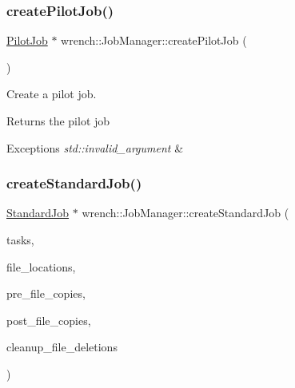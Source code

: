 \subsubsection{\texorpdfstring{create\+Pilot\+Job()}{createPilotJob()}}
{\footnotesize\ttfamily \hyperlink{classwrench_1_1_pilot_job}{Pilot\+Job} $\ast$ wrench\+::\+Job\+Manager\+::create\+Pilot\+Job (\begin{DoxyParamCaption}{ }\end{DoxyParamCaption})}



Create a pilot job. 

\begin{DoxyReturn}{Returns}
the pilot job
\end{DoxyReturn}

\begin{DoxyExceptions}{Exceptions}
{\em std\+::invalid\+\_\+argument} & \\
\hline
\end{DoxyExceptions}
\mbox{\label{classwrench_1_1_job_manager_a7f3873e56c8813c90b66683690d6b328}} 
\subsubsection{\texorpdfstring{create\+Standard\+Job()}{createStandardJob()}\hspace{0.1cm}{\footnotesize\ttfamily [1/3]}}
{\footnotesize\ttfamily \hyperlink{classwrench_1_1_standard_job}{Standard\+Job} $\ast$ wrench\+::\+Job\+Manager\+::create\+Standard\+Job (\begin{DoxyParamCaption}\item[{std\+::vector$<$ \hyperlink{classwrench_1_1_workflow_task}{Workflow\+Task} $\ast$$>$}]{tasks,  }\item[{std\+::map$<$ \hyperlink{classwrench_1_1_workflow_file}{Workflow\+File} $\ast$, \hyperlink{classwrench_1_1_storage_service}{Storage\+Service} $\ast$$>$}]{file\+\_\+locations,  }\item[{std\+::set$<$ std\+::tuple$<$ \hyperlink{classwrench_1_1_workflow_file}{Workflow\+File} $\ast$, \hyperlink{classwrench_1_1_storage_service}{Storage\+Service} $\ast$, \hyperlink{classwrench_1_1_storage_service}{Storage\+Service} $\ast$$>$$>$}]{pre\+\_\+file\+\_\+copies,  }\item[{std\+::set$<$ std\+::tuple$<$ \hyperlink{classwrench_1_1_workflow_file}{Workflow\+File} $\ast$, \hyperlink{classwrench_1_1_storage_service}{Storage\+Service} $\ast$, \hyperlink{classwrench_1_1_storage_service}{Storage\+Service} $\ast$$>$$>$}]{post\+\_\+file\+\_\+copies,  }\item[{std\+::set$<$ std\+::tuple$<$ \hyperlink{classwrench_1_1_workflow_file}{Workflow\+File} $\ast$, \hyperlink{classwrench_1_1_storage_service}{Storage\+Service} $\ast$$>$$>$}]{cleanup\+\_\+file\+\_\+deletions }\end{DoxyParamCaption})}



